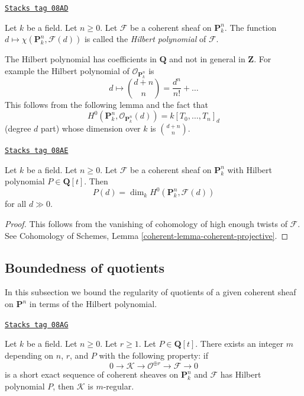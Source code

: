 \begin{definition}
\label{varieties-definition-hilbert-polynomial}
\href{https://stacks.math.columbia.edu/tag/08AD}{\texttt{Stacks tag 08AD}}

Let $k$ be a field. Let $n \geq 0$. Let $\mathcal{F}$ be a coherent sheaf
on $\mathbf{P}^n_k$. The function
$d \mapsto \chi(\mathbf{P}^n_k, \mathcal{F}(d))$ is called the
{\it Hilbert polynomial} of $\mathcal{F}$.
\end{definition}

The Hilbert polynomial has coefficients in $\mathbf{Q}$ and not
in general in $\mathbf{Z}$. For example the Hilbert polynomial
of $\mathcal{O}_{\mathbf{P}^n_k}$ is
$$
d \longmapsto {d + n \choose n} = \frac{d^n}{n!} + \ldots
$$
This follows from the following lemma and the fact that
$$
H^0(\mathbf{P}^n_k, \mathcal{O}_{\mathbf{P}^n_k}(d)) = k[T_0, \ldots, T_n]_d
$$
(degree $d$ part) whose dimension over $k$ is ${d + n \choose n}$.

\begin{lemma}
\label{varieties-lemma-hilbert-polynomial-H0}
\href{https://stacks.math.columbia.edu/tag/08AE}{\texttt{Stacks tag 08AE}}

Let $k$ be a field. Let $n \geq 0$. Let $\mathcal{F}$ be a coherent sheaf
on $\mathbf{P}^n_k$ with Hilbert polynomial $P \in \mathbf{Q}[t]$.
Then
$$
P(d) = \dim_k H^0(\mathbf{P}^n_k, \mathcal{F}(d))
$$
for all $d \gg 0$.
\end{lemma}

\begin{proof}
This follows from the vanishing of cohomology of high enough twists
of $\mathcal{F}$. See
Cohomology of Schemes,
Lemma \ref{coherent-lemma-coherent-projective}.
\end{proof}


\subsection{Boundedness of quotients}
\label{varieties-subsection-boundedness}

In this subsection we bound the regularity of quotients of
a given coherent sheaf on $\mathbf{P}^n$ in terms of the
Hilbert polynomial.

\begin{lemma}
\label{varieties-lemma-bound-quotients-free}
\href{https://stacks.math.columbia.edu/tag/08AG}{\texttt{Stacks tag 08AG}}

Let $k$ be a field. Let $n \geq 0$. Let $r \geq 1$. Let $P \in \mathbf{Q}[t]$.
There exists an integer $m$ depending on $n$, $r$, and $P$
with the following property: if
$$
0 \to \mathcal{K} \to \mathcal{O}^{\oplus r} \to \mathcal{F} \to 0
$$
is a short exact sequence of coherent sheaves on $\mathbf{P}^n_k$
and $\mathcal{F}$ has Hilbert polynomial $P$, then
$\mathcal{K}$ is $m$-regular.
\end{lemma}

